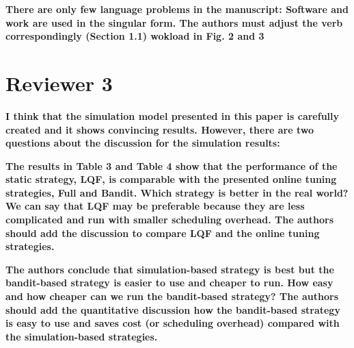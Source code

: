 \documentclass[]{article}
\begin{document}
\textbf{There are only few language problems in the manuscript:
Software and work are used in the singular form. The authors must adjust the verb correspondingly (Section 1.1)
wokload in Fig. 2 and 3
}



\section{Reviewer 3}

\textbf{I think that the simulation model presented in this paper is carefully created and it shows convincing results.
However, there are two questions about the discussion for the simulation results:
}

\textbf{The results in Table 3 and Table 4 show that the performance of the static strategy, LQF, is comparable with the
presented online tuning strategies, Full and Bandit. Which strategy is better in the real world? We can say that LQF
may be preferable because they are less complicated and run with smaller scheduling overhead. The authors should add
the discussion to compare LQF and the online tuning strategies.
}

\textbf{The authors conclude that simulation-based strategy is best but the bandit-based strategy is easier to use and cheaper
to run. How easy and how cheaper can we run the bandit-based strategy? The authors should add the quantitative
discussion how the bandit-based strategy is easy to use and saves cost (or scheduling overhead) compared with the
simulation-based strategies.
}



\end{document}

